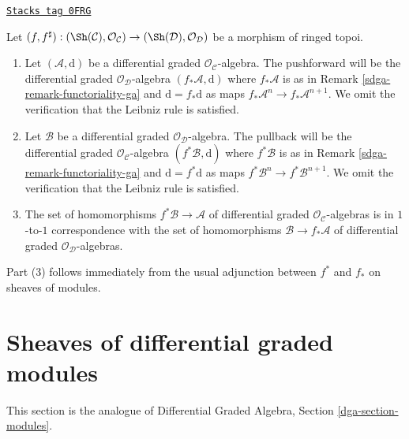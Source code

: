 \begin{remark}
\label{sdga-remark-functoriality-dga}
\href{https://stacks.math.columbia.edu/tag/0FRG}{\texttt{Stacks tag 0FRG}}

Let $(f, f^\sharp) : (\Sh(\mathcal{C}), \mathcal{O}_\mathcal{C})
\to (\Sh(\mathcal{D}), \mathcal{O}_\mathcal{D})$
be a morphism of ringed topoi.
\begin{enumerate}
\item Let $(\mathcal{A}, \text{d})$ be a differential graded
$\mathcal{O}_\mathcal{C}$-algebra. The pushforward will be
the differential graded $\mathcal{O}_\mathcal{D}$-algebra
$(f_*\mathcal{A}, \text{d})$ where $f_*\mathcal{A}$ is as in
Remark \ref{sdga-remark-functoriality-ga} and
$\text{d} = f_*\text{d}$ as maps $f_*\mathcal{A}^n \to f_*\mathcal{A}^{n + 1}$.
We omit the verification that the Leibniz rule is satisfied.
\item Let $\mathcal{B}$ be a differential graded
$\mathcal{O}_\mathcal{D}$-algebra. The pullback will be the
differential graded $\mathcal{O}_\mathcal{C}$-algebra
$(f^*\mathcal{B}, \text{d})$ where $f^*\mathcal{B}$ is as in
Remark \ref{sdga-remark-functoriality-ga} and
$\text{d} = f^*\text{d}$ as maps $f^*\mathcal{B}^n \to f^*\mathcal{B}^{n + 1}$.
We omit the verification that the Leibniz rule is satisfied.
\item The set of homomorphisms $f^*\mathcal{B} \to \mathcal{A}$
of differential graded $\mathcal{O}_\mathcal{C}$-algebras is in
$1$-to-$1$ correspondence with the set of homomorphisms
$\mathcal{B} \to f_*\mathcal{A}$ of differential graded
$\mathcal{O}_\mathcal{D}$-algebras.
\end{enumerate}
Part (3) follows immediately from the usual adjunction between $f^*$ and $f_*$
on sheaves of modules.
\end{remark}

\section{Sheaves of differential graded modules}
\label{sdga-section-modules}
This section is the analogue of
Differential Graded Algebra, Section \ref{dga-section-modules}.

